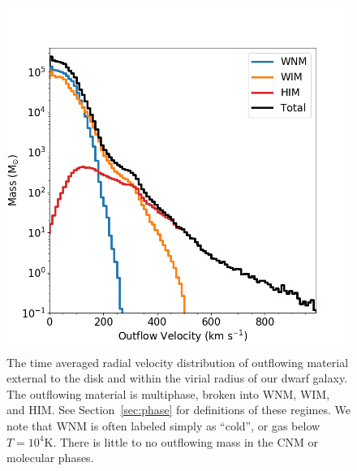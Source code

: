 \documentclass[twocolumn]{aastex61}
\begin{document}
\begin{figure}
\centering
\includegraphics[width=0.95\linewidth]{outflow_velocity_distribution}
\caption{The time averaged radial velocity distribution of outflowing material external to the disk and within the virial radius of our dwarf galaxy. The outflowing material is multiphase, broken into WNM, WIM, and HIM. See Section~\ref{sec:phase} for definitions of these regimes. We note that WNM is often labeled simply as ``cold'', or gas below $T = 10^{4}$K. There is little to no outflowing mass in the CNM or molecular phases.}
\label{fig:outflow_velocity}
\end{figure}
\end{document}
